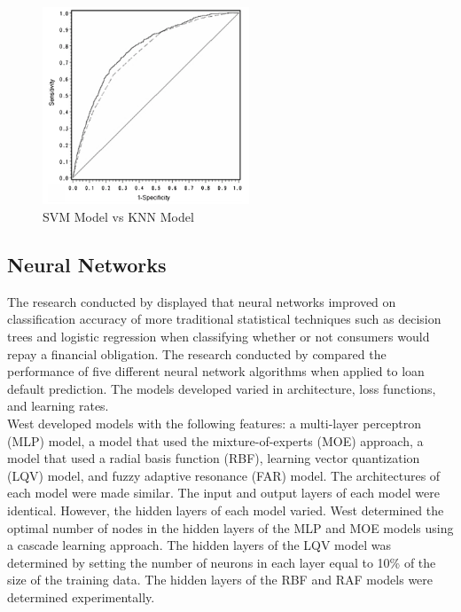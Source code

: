 \begin{figure}[!htb]
\centering
\includegraphics[width=0.55\textwidth]{images/SVMKNN.png}
\caption{SVM Model vs KNN Model}
\label{fig:SVMKNN}
\end{figure}

\vspace{10pt}

\subsection{Neural Networks}

The research conducted by \textcite{DecTreesZekic} displayed that neural networks improved on classification accuracy of more traditional statistical techniques such as decision trees and logistic regression when classifying whether or not consumers would repay a financial obligation. The research conducted by \textcite{NNWest} compared the performance of five different neural network algorithms when applied to loan default prediction.  The models developed varied in architecture, loss functions, and learning rates.  \\

West developed models with the following features: a multi-layer perceptron (MLP) model, a model that used the mixture-of-experts (MOE) approach, a model that used a radial basis function (RBF), learning vector quantization (LQV) model, and fuzzy adaptive resonance (FAR) model. The architectures of each model were made similar. The input and output layers of each model were identical. However, the hidden layers of each model varied. West determined the optimal number of nodes in the hidden layers of the MLP and MOE models using a cascade learning approach. The hidden layers of the LQV model was determined by setting the number of neurons in each layer equal to 10\% of the size of the training data. The hidden layers of the RBF and RAF models were determined experimentally.  \\

